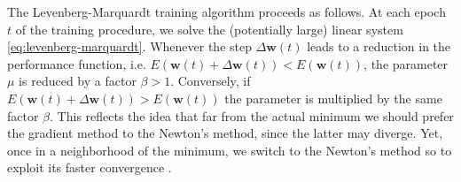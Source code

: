 \documentclass[11pt, a4paper]{report}
\numberwithin{equation}{chapter}
\theoremstyle{theorem}
\theoremstyle{definition}
\numberwithin{figure}{section}
\begin{document}
		The Levenberg-Marquardt training algorithm proceeds as follows. At each epoch $t$ of the training procedure, we solve the (potentially large) linear system \eqref{eq:levenberg-marquardt}. Whenever the step $\Delta \boldsymbol{w}(t)$ leads to a reduction in the performance function, i.e. $E(\boldsymbol{w}(t) + \Delta \boldsymbol{w}(t)) < E(\boldsymbol{w}(t))$, the parameter $\mu$ is reduced by a factor $\beta > 1$. Conversely, if $E(\boldsymbol{w}(t) + \Delta \boldsymbol{w}(t)) > E(\boldsymbol{w}(t))$ the parameter is multiplied by the same factor $\beta$. This reflects the idea that far from the actual minimum we should prefer the gradient method to the Newton's method, since the latter may diverge. Yet, once in a neighborhood of the minimum, we switch to the Newton's method so to exploit its faster convergence \cite{Mar63}.
		
\end{document}
